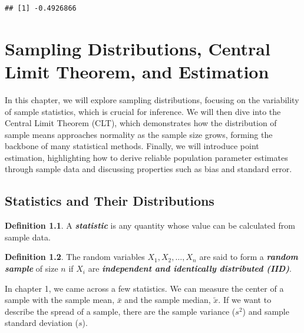 \documentclass[
  11pt,
  oneside]{book}
\newenvironment{Shaded}{\begin{snugshade}}{\end{snugshade}}
\newcommand{\FunctionTok}[1]{\textcolor[rgb]{0.13,0.29,0.53}{\textbf{#1}}}
\newcommand{\NormalTok}[1]{#1}
\newcommand{\SpecialCharTok}[1]{\textcolor[rgb]{0.81,0.36,0.00}{\textbf{#1}}}
\theoremstyle{definition}
\newtheorem{definition}{Definition}[chapter]
\theoremstyle{definition}
\theoremstyle{definition}
\theoremstyle{definition}
\theoremstyle{remark}
\begin{document}
\begin{Shaded}
\end{Shaded}

\begin{verbatim}
## [1] -0.4926866
\end{verbatim}

\chapter{Sampling Distributions, Central Limit Theorem, and Estimation}\label{sampling-distributions-central-limit-theorem-and-estimation}

In this chapter, we will explore sampling distributions, focusing on the variability of sample statistics, which is crucial for inference. We will then dive into the Central Limit Theorem (CLT), which demonstrates how the distribution of sample means approaches normality as the sample size grows, forming the backbone of many statistical methods. Finally, we will introduce point estimation, highlighting how to derive reliable population parameter estimates through sample data and discussing properties such as bias and standard error.

\section{Statistics and Their Distributions}\label{statistics-and-their-distributions}

\begin{definition}
A \textbf{\emph{statistic}} is any quantity whose value can be calculated from sample data.
\end{definition}

\begin{definition}
The random variables \(X_1, X_2, \ldots, X_n\) are said to form a \textbf{\emph{random sample}} of size \(n\) if \(X_i\) are \textbf{\emph{independent and identically distributed (IID)}}.
\end{definition}

In chapter 1, we came across a few statistics. We can measure the center of a sample with the sample mean, \(\bar{x}\) and the sample median, \(\tilde{x}\). If we want to describe the spread of a sample, there are the sample variance (\(s^2\)) and sample standard deviation (\(s\)).
\end{document}
